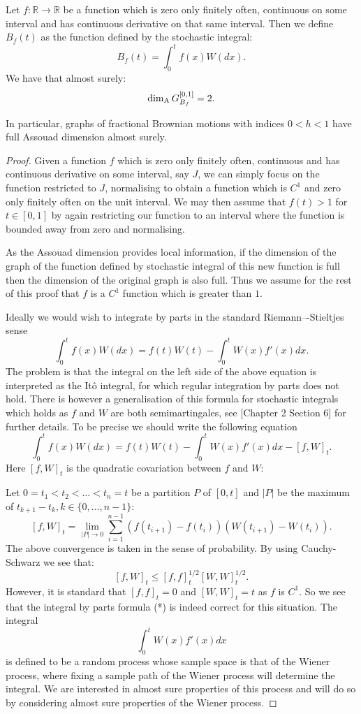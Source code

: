 \begin{theorem}
	Let $f:\mathbb{R}\to\mathbb{R}$ be a function which is zero only finitely often, continuous on some interval and has continuous derivative on that same interval. Then we define $B_f(t)$ as the function defined by the stochastic integral:
	\[	
	B_f(t)=\int_0^t f(x) W(dx).
	\]
	We have that almost surely:
	\[
	\dim_{\textup{A}} G_{B_f}^{[0,1]}=2.
	\]
\end{theorem}
\begin{remark}
	In particular, graphs of fractional Brownian motions with indices $0<h<1$ have full Assouad dimension almost surely.
\end{remark}
\begin{proof}
	Given a function $f$ which is zero only finitely often, continuous and has continuous derivative on some interval, say $J$, we can simply focus on the function restricted to $J$, normalising to obtain a function which is $C^1$ and zero only finitely often on the unit interval. We may then assume that $f(t)>1$ for $t\in [0,1]$ by again restricting our function to an interval where the function is bounded away from zero and normalising. 
	
	As the Assouad dimension provides local information, if the dimension of the graph of the function defined by stochastic integral of this new function is full then the dimension of the original graph is also full. Thus we assume for the rest of this proof that $f$ is a $C^1$ function which is greater than $1$.
	
	Ideally we would wish to integrate by parts in the standard Riemann–-Stieltjes sense
	\[
	\int_{0}^{t}f(x)W(dx)=f(t)W(t)-\int_{0}^{t}W(x)f'(x)dx.\tag{*}
	\]
	The problem is that the integral on the left side of the above equation is interpreted as the It\^{o} integral, for which regular integration by parts does not hold. There is however a generalisation of this formula for stochastic integrals which holds as $f$ and $W$ are both semimartingales, see \cite{Pr}[Chapter 2 Section 6] for further details. To be precise we should write the following equation
	\[
	\int_{0}^{t}f(x)W(dx)=f(t)W(t)-\int_{0}^{t}W(x)f'(x)dx-[f,W]_t.
	\]
	Here $[f,W]_t$ is the quadratic covariation between $f$ and $W$:
	
	Let $0=t_1<t_2<\dots<t_n=t$ be a partition $P$ of $[0,t]$ and $\vert P \vert$ be the maximum of $t_{k+1}-t_k,k\in\{0,\dots,n-1\}$:
	\[
	[f,W]_t=\lim_{\vert P\vert\to 0} \sum_{i=1}^{n-1} (f(t_{i+1})-f(t_{i}))(W(t_{i+1})-W(t_i)).
	\]
	The above convergence is taken in the sense of probability. By using Cauchy-Schwarz we see that:
	\[
	[f,W]_t\leq [f,f]^{1/2}_t[W,W]^{1/2}_t.
	\]
	However, it is standard that $[f,f]_t=0$ and $[W,W]_t=t$ as $f$ is $C^1$. So we see that the integral by parts formula (*) is indeed correct for this situation. The integral 
	\[
	\int_0^{t} W(x)f'(x)dx
	\]
	is defined to be a random process whose sample space is that of the Wiener process, where fixing a sample path of the Wiener process will determine the integral. We are interested in almost sure properties of this process and will do so by considering almost sure properties of the Wiener process.
	

\end{proof}
